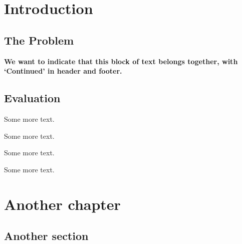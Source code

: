 \documentclass[openany]{book}
\begin{document}
\tableofcontents
\newpage
{}
\chapter{Introduction}

\lipsum

\section{The Problem}
\label{sec:problem}
\textbf{We want to indicate that this block of text belongs together, with `Continued' in header and footer.}

\lipsum[1]
\extramarks{}{}

\section{Evaluation}

\lipsum

Some more text.

Some more text.

Some more text.

Some more text.

\chapter{Another chapter}

\label{cha:another-chapter}

\lipsum[2]

\section{Another section}

\lipsum[3-4]
\end{document}
